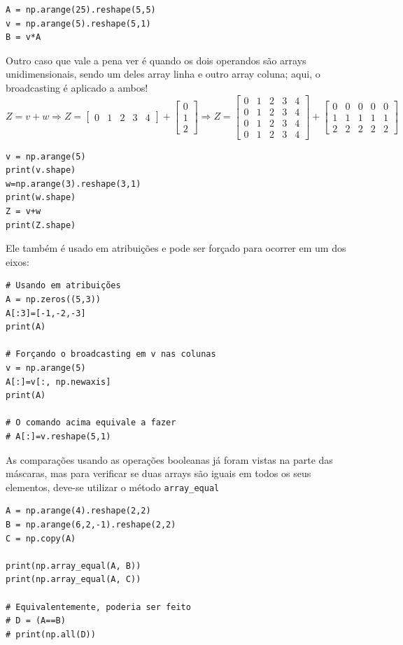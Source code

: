 \documentclass[../numerical_methods.tex]{subfiles}
\begin{document}
\begin{verbatim}
A = np.arange(25).reshape(5,5)
v = np.arange(5).reshape(5,1)
B = v*A
\end{verbatim}
Outro caso que vale a pena ver é quando os dois operandos são arrays unidimensionais, sendo um deles array linha e outro array coluna; aqui, o broadcasting é aplicado a ambos!
\[
	Z = v+w \Rightarrow Z= \begin{bmatrix}
		0 & 1 & 2 & 3 & 4
	\end{bmatrix} + \begin{bmatrix}
		0 \\
		1 \\
		2
	\end{bmatrix} \Rightarrow Z =\begin{bmatrix}
		0 & 1 & 2 & 3 & 4 \\
		0 & 1 & 2 & 3 & 4 \\
		0 & 1 & 2 & 3 & 4 \\
		0 & 1 & 2 & 3 & 4
	\end{bmatrix}+ \begin{bmatrix}
		0 & 0 & 0 & 0 & 0 \\
		1 & 1 & 1 & 1 & 1 \\
		2 & 2 & 2 & 2 & 2
	\end{bmatrix}
\]
\begin{verbatim}
v = np.arange(5)
print(v.shape)
w=np.arange(3).reshape(3,1)
print(w.shape)
Z = v+w
print(Z.shape)
\end{verbatim}
Ele também é usado em atribuições e pode ser forçado para ocorrer em um dos eixos:
\begin{verbatim}
# Usando em atribuições
A = np.zeros((5,3))
A[:3]=[-1,-2,-3]
print(A)

# Forçando o broadcasting em v nas colunas 
v = np.arange(5)
A[:]=v[:, np.newaxis]
print(A)

# O comando acima equivale a fazer 
# A[:]=v.reshape(5,1)
\end{verbatim}

As comparações usando as operações booleanas já foram vistas na parte das máscaras, mas para verificar se duas arrays são iguais em todos os seus elementos, deve-se utilizar o método \texttt{array\_equal}
\begin{verbatim}
A = np.arange(4).reshape(2,2)
B = np.arange(6,2,-1).reshape(2,2)
C = np.copy(A)

print(np.array_equal(A, B))
print(np.array_equal(A, C))

# Equivalentemente, poderia ser feito 
# D = (A==B)
# print(np.all(D))
\end{verbatim}
\end{document}
